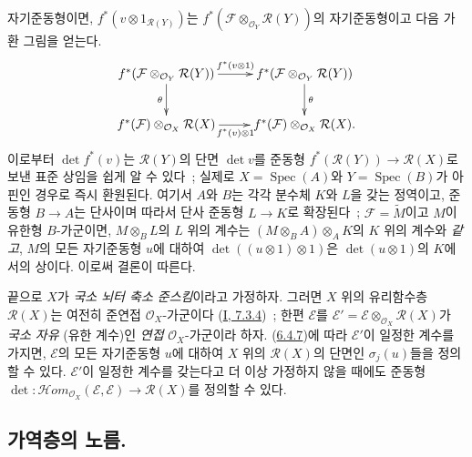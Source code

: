 \begin{env}[6.4.9]
자기준동형이면,
$f^*(v\otimes1_{\mathcal{R}(Y)})$는
$f^*(\mathcal{F}\otimes_{\mathcal{O}_Y}\mathcal{R}(Y))$의
자기준동형이고 다음 가환 그림을 얻는다.
\[
\xymatrix{
f^*(\mathcal{F}\otimes_{\mathcal{O}_Y}\mathcal{R}(Y))
  \ar[r]^{f^*(v\otimes1)}\ar[d]_{\theta}
& f^*(\mathcal{F}\otimes_{\mathcal{O}_Y}\mathcal{R}(Y))\ar[d]^{\theta}\\
f^*(\mathcal{F})\otimes_{\mathcal{O}_X}\mathcal{R}(X)
  \ar[r]_{f^*(v)\otimes1}
& f^*(\mathcal{F})\otimes_{\mathcal{O}_X}\mathcal{R}(X).
}
\]
이로부터 $\det f^*(v)$는 $\mathcal{R}(Y)$의 단면 $\det v$를
준동형 $f^*(\mathcal{R}(Y))\to\mathcal{R}(X)$로 보낸 표준 상임을 쉽게
알 수 있다~; 실제로 $X=\operatorname{Spec}(A)$와
$Y=\operatorname{Spec}(B)$가 아핀인 경우로 즉시 환원된다. 여기서 $A$와
$B$는 각각 분수체 $K$와 $L$을 갖는 정역이고, 준동형 $B\to A$는
단사이며 따라서 단사 준동형 $L\to K$로 확장된다~;
$\mathcal{F}=\widetilde{M}$이고 $M$이 유한형 $B$-가군이면,
$M\otimes_B L$의 $L$ 위의 계수는
$(M\otimes_B A)\otimes_A K$의 $K$ 위의 계수와 \emph{같고}, $M$의 모든
자기준동형 $u$에 대하여 $\det((u\otimes1)\otimes1)$은
$\det(u\otimes1)$의 $K$에서의 상이다. 이로써 결론이 따른다.
\end{env}

\begin{env}[6.4.10]
\label{II.6.4.10-ko}
끝으로 $X$가 \emph{국소 뇌터 축소 준스킴}이라고 가정하자. 그러면
$X$ 위의 유리함수층 $\mathcal{R}(X)$는 여전히 준연접
$\mathcal{O}_X$-가군이다
(\hyperref[I.7.3.4-ko]{I, 7.3.4})~; 한편 $\mathcal{E}$를
$\mathcal{E}'=\mathcal{E}\otimes_{\mathcal{O}_X}\mathcal{R}(X)$가
\emph{국소 자유} (유한 계수)인 \emph{연접} $\mathcal{O}_X$-가군이라
하자. (\hyperref[II.6.4.7-ko]{6.4.7})에 따라 $\mathcal{E}'$이 일정한
계수를 가지면, $\mathcal{E}$의 모든 자기준동형 $u$에 대하여
$X$ 위의 $\mathcal{R}(X)$의 단면인 $\sigma_j(u)$들을 정의할 수 있다.
$\mathcal{E}'$이 일정한 계수를 갖는다고 더 이상 가정하지 않을 때에도
준동형
$\det:\mathcal{H}om_{\mathcal{O}_X}(\mathcal{E},\mathcal{E})
\to\mathcal{R}(X)$를 정의할 수 있다.
\end{env}

\subsection{가역층의 노름.}
\label{subsection:II.6.5-ko}

